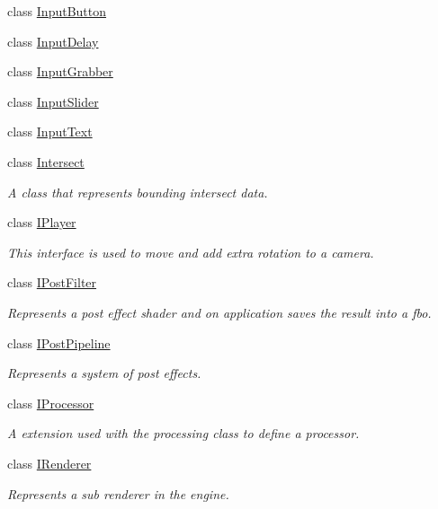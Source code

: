 \begin{DoxyCompactItemize}
class \hyperlink{class_flounder_1_1_input_button}{Input\+Button}
\item 
class \hyperlink{class_flounder_1_1_input_delay}{Input\+Delay}
\item 
class \hyperlink{class_flounder_1_1_input_grabber}{Input\+Grabber}
\item 
class \hyperlink{class_flounder_1_1_input_slider}{Input\+Slider}
\item 
class \hyperlink{class_flounder_1_1_input_text}{Input\+Text}
\item 
class \hyperlink{class_flounder_1_1_intersect}{Intersect}
\begin{DoxyCompactList}\small\item\em A class that represents bounding intersect data. \end{DoxyCompactList}\item 
class \hyperlink{class_flounder_1_1_i_player}{I\+Player}
\begin{DoxyCompactList}\small\item\em This interface is used to move and add extra rotation to a camera. \end{DoxyCompactList}\item 
class \hyperlink{class_flounder_1_1_i_post_filter}{I\+Post\+Filter}
\begin{DoxyCompactList}\small\item\em Represents a post effect shader and on application saves the result into a fbo. \end{DoxyCompactList}\item 
class \hyperlink{class_flounder_1_1_i_post_pipeline}{I\+Post\+Pipeline}
\begin{DoxyCompactList}\small\item\em Represents a system of post effects. \end{DoxyCompactList}\item 
class \hyperlink{class_flounder_1_1_i_processor}{I\+Processor}
\begin{DoxyCompactList}\small\item\em A extension used with the processing class to define a processor. \end{DoxyCompactList}\item 
class \hyperlink{class_flounder_1_1_i_renderer}{I\+Renderer}
\begin{DoxyCompactList}\small\item\em Represents a sub renderer in the engine. \end{DoxyCompactList}\item 

\end{DoxyCompactItemize}
